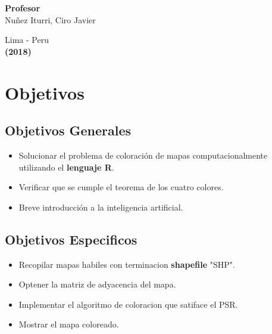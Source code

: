 \documentclass[a4paper]{article}
\begin{document}
\begin{titlepage}
\begin{center}
\begin{large}
\end{large}

\vspace*{0.4in}
\begin{large}
{\bf Profesor} 
\vspace*{0.1in}
\\Nuñez Iturri, Ciro Javier
\end{large}

\end{center}
\begin{center}
\begin{large}
\vspace*{1.0in}
Lima - Peru\\
{\bf (2018)}
\end{large}
\end{center}
\end{titlepage}

\pagebreak
\tableofcontents
\pagebreak


\section{Objetivos}
\subsection{Objetivos Generales}
\begin{itemize}

\item Solucionar el problema de coloración de mapas computacionalmente utilizando el \textbf{lenguaje R}.
\item Verificar que se cumple el teorema de los cuatro colores.
\item Breve introducción a la inteligencia artificial.
\end{itemize}

\subsection{Objetivos Especificos}
\begin{itemize}
\item Recopilar mapas habiles con terminacion \textbf{shapefile} "SHP".
\item Optener la matriz de adyacencia del mapa.
\item Implementar el algoritmo de coloracion que satiface el PSR.
\item Mostrar el mapa coloreado.
\end{itemize}
\end{document}
